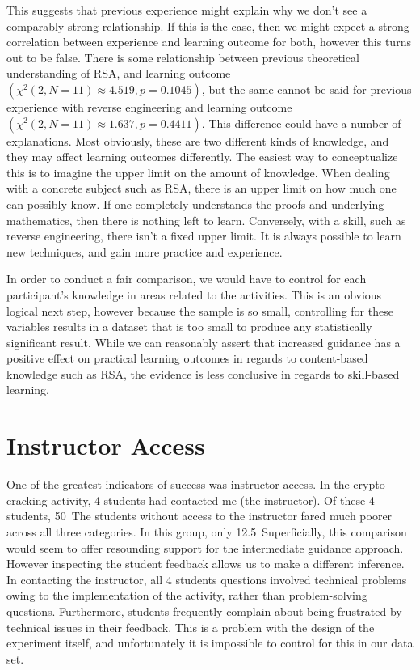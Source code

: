         This suggests that previous experience might explain why we don't see a comparably strong relationship. %
If this is the case, then we might expect a strong correlation between experience and learning outcome for both, however this turns out to be false. %
There is some relationship between previous theoretical understanding of RSA, and learning outcome $(\chi^2(2, N=11)\approx4.519,  p = 0.1045)$, but the same cannot be said for previous experience with reverse engineering and learning outcome $(\chi^2(2, N=11)\approx1.637,  p = 0.4411)$. %
This difference could have a number of explanations. %
Most obviously, these are two different kinds of knowledge, and they may affect learning outcomes differently. %
The easiest way to conceptualize this is to imagine the upper limit on the amount of knowledge. %
When dealing with a concrete subject such as RSA, there is an upper limit on how much one can possibly know. %
If one completely understands the proofs and underlying mathematics, then there is nothing left to learn. %
Conversely, with a skill, such as reverse engineering, there isn't a fixed upper limit. %
It is always possible to learn new techniques, and gain more practice and experience. 

        In order to conduct a fair comparison, we would have to control for each participant's knowledge in areas related to the activities. %
This is an obvious logical next step, however because the sample is so small, controlling for these variables results in a dataset that is too small to produce any statistically significant result. %
While we can reasonably assert that increased guidance has a positive effect on practical learning outcomes in regards to content-based knowledge such as RSA, the evidence is less conclusive in regards to skill-based learning. 

        
    \section{Instructor Access}
        One of the greatest indicators of success was instructor access. %
In the crypto cracking activity, 4 students had contacted me (the instructor). %
Of these 4 students, 50\
        The students without access to the instructor fared much poorer across all three categories. %
In this group, only 12.5\
        Superficially, this comparison would seem to offer resounding support for the intermediate guidance approach. %
However inspecting the student feedback allows us to make a different inference. %
In contacting the instructor, all 4 students questions involved technical problems owing to the implementation of the activity, rather than problem-solving questions. %
Furthermore, students frequently complain about being frustrated by technical issues in their feedback. %
This is a problem with the design of the experiment itself, and unfortunately it is impossible to control for this in our data set. 

